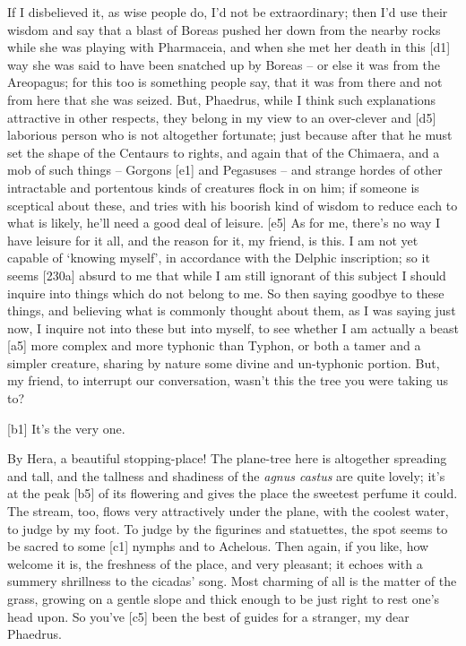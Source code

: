  If I disbelieved it, as wise
people do, I'd not be
extraordinary; then I'd use their wisdom and say that a blast of Boreas
pushed her down from the nearby rocks while she was playing with
Pharmaceia, and when she met her death in this {[}d1{]} way she was said
to have been snatched up by Boreas -- or else it was from the Areopagus;
for this too is something people say, that it was from there and not
from here that she was seized. But, Phaedrus, while I think such
explanations attractive in other respects, they belong in my view to an
over-clever and {[}d5{]} laborious person who is not altogether
fortunate; just because after that he must set the shape of the Centaurs
to rights, and again that of the Chimaera, and a mob of such things --
Gorgons {[}e1{]} and Pegasuses -- and strange hordes of other
intractable and portentous kinds of creatures flock in on him; if
someone is sceptical about these, and tries with his boorish kind of
wisdom to reduce each to what is likely, he'll need a good deal of
leisure. {[}e5{]} As for me, there's no way I have leisure for it all,
and the reason for it, my friend, is this. I am not yet capable of
‘knowing myself', in accordance with the Delphic
inscription; so it seems
{[}230a{]} absurd to me that while I am still ignorant of this subject I
should inquire into things which do not belong to me. So then saying
goodbye to these things, and believing what is commonly thought about
them, as I was saying just now, I inquire not into these but into
myself, to see whether I am actually a beast {[}a5{]} more complex and
more typhonic than
Typhon, or both a tamer
and a simpler creature, sharing by nature some divine and un-typhonic
portion. But, my friend, to interrupt our
conversation, wasn't this
the tree you were taking us to?

{[}b1{]}  It's the very one.

 By Hera, a beautiful
stopping-place! The
plane-tree here is altogether spreading and tall, and the tallness and
shadiness of the {\em agnus
castus} are quite lovely;
it's at the peak {[}b5{]} of its flowering and gives the place the
sweetest perfume it could. The stream, too, flows very attractively
under the plane, with the coolest water, to judge by my foot. To judge
by the figurines and statuettes, the spot seems to be sacred to some
{[}c1{]} nymphs and to
Achelous. Then again, if
you like, how welcome it is, the freshness of the place, and very
pleasant; it echoes with a summery shrillness to the cicadas' song. Most
charming of all is the matter of the grass, growing on a gentle slope
and thick enough to be just right to rest one's head upon. So you've
{[}c5{]} been the best of guides for a stranger, my dear Phaedrus.

